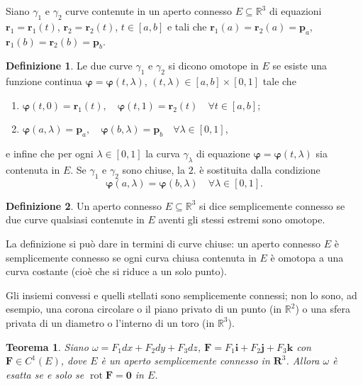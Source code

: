 \documentclass[a4paper]{book}
\DeclareMathOperator{\rot}{rot}
\numberwithin{equation}{section}
\renewcommand{\phi}{\varphi}
\theoremstyle{plain}
\newtheorem{teor}{Teorema}[section]
\theoremstyle{definition}
\newtheorem{defn}{Definizione}[section]
\theoremstyle{remark}
\renewcommand{\vec}{\boldsymbol}
\theoremstyle{example}
\begin{document}
Siano $\gamma_1$ e $\gamma_2$ curve contenute in un aperto connesso $E \subseteq \mathbb{R}^3$ di equazioni $\vec{r}_1 = \vec{r}_1(t)$, $\vec{r}_2 = \vec{r}_2(t)$, $t \in [a, b]$ e tali che $\vec{r}_1(a) = \vec{r}_2(a)=\vec{p}_a$, $\vec{r}_1(b) = \vec{r}_2(b) = \vec{p}_b$.

	\begin{defn}
	Le due curve $\gamma_1$ e $\gamma_2$ si dicono omotope in $E$ se esiste una funzione continua $\vec{\phi} = \vec{\phi}(t, \lambda)$, $(t, \lambda) \in [a, b] \times [0, 1]$ tale che
	\begin{enumerate}
	\item $\vec{\phi}(t, 0) = \vec{r}_1(t), \quad \vec{\phi}(t, 1) = \vec{r}_2(t) \quad \forall t \in [a, b]$;
	\item $\vec{\phi}(a, \lambda) = \vec{p}_a, \quad \vec{\phi}(b, \lambda) = \vec{p}_b \quad \forall \lambda \in [0, 1] $,
	\end{enumerate}
e infine che per ogni $\lambda \in [0, 1]$ la curva $\gamma_{\lambda}$ di equazione $\vec{\phi} = \vec{\phi}(t, \lambda)$ sia contenuta in $E$. Se $\gamma_1$ e $\gamma_2$ sono chiuse, la $2.$ è sostituita dalla condizione
	\begin{equation*}
	\vec{\phi}(a, \lambda) = \vec{\phi}(b, \lambda) \quad \forall \lambda \in [0, 1].
	\end{equation*}
	\end{defn}

\begin{defn}
Un aperto connesso $E \subseteq \mathbb{R}^3$ si dice semplicemente connesso se due curve qualsiasi contenute in $E$ aventi gli stessi estremi sono omotope.
\end{defn}

La definizione si può dare in termini di curve chiuse: un aperto connesso $E$ è semplicemente connesso se ogni curva chiusa contenuta in $E$ è omotopa a una curva costante (cioè che si riduce a un solo punto).

Gli insiemi convessi e quelli stellati sono semplicemente connessi; non lo sono, ad esempio, una corona circolare o il piano privato di un punto (in $\mathbb{R}^2$) o una sfera privata di un diametro o l'interno di un toro (in $\mathbb{R}^3$). 

\begin{teor}
Siano $\omega = F_1dx + F_2 dy + F_3 dz$, $\vec{F} = F_1\vec{i} + F_2\vec{j} + F_3\vec{k}$ con $\vec{F} \in C^1(E)$, dove $E$ è un aperto semplicemente connesso in $\vec{R}^3$. Allora $\omega$ è esatta se e solo se $\rot{\vec{F}} = \vec{0}$ in $E$.
\end{teor}
\end{document}
